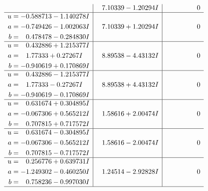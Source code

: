 \documentclass[1p]{elsarticle_modified}
\theoremstyle{definition}
\begin{document}
$$\begin{array}{c|c|c}
 & \phantom{-}7.10339 - 1.20294 I & \phantom{-0.000000 } 0 \\ \hline\begin{aligned}
u &= -0.588713 - 1.140278 I \\
a &= -0.749426 - 1.002063 I \\
b &= \phantom{-}0.478478 - 0.284830 I\end{aligned}
 & \phantom{-}7.10339 + 1.20294 I & \phantom{-0.000000 } 0 \\ \hline\begin{aligned}
u &= \phantom{-}0.432886 + 1.215377 I \\
a &= \phantom{-}1.77333 + 0.27267 I \\
b &= -0.940619 + 0.170869 I\end{aligned}
 & \phantom{-}8.89538 - 4.43132 I & \phantom{-0.000000 } 0 \\ \hline\begin{aligned}
u &= \phantom{-}0.432886 - 1.215377 I \\
a &= \phantom{-}1.77333 - 0.27267 I \\
b &= -0.940619 - 0.170869 I\end{aligned}
 & \phantom{-}8.89538 + 4.43132 I & \phantom{-0.000000 } 0 \\ \hline\begin{aligned}
u &= \phantom{-}0.631674 + 0.304895 I \\
a &= -0.067306 + 0.565212 I \\
b &= \phantom{-}0.707815 + 0.717572 I\end{aligned}
 & \phantom{-}1.58616 + 2.00474 I & \phantom{-0.000000 } 0 \\ \hline\begin{aligned}
u &= \phantom{-}0.631674 - 0.304895 I \\
a &= -0.067306 - 0.565212 I \\
b &= \phantom{-}0.707815 - 0.717572 I\end{aligned}
 & \phantom{-}1.58616 - 2.00474 I & \phantom{-0.000000 } 0 \\ \hline\begin{aligned}
u &= \phantom{-}0.256776 + 0.639731 I \\
a &= -1.249302 - 0.460250 I \\
b &= \phantom{-}0.758236 - 0.997030 I\end{aligned}
 & \phantom{-}1.24514 - 2.92828 I & \phantom{-0.000000 } 0\\
 \hline 
 \end{array}$$\newpage$$\begin{array}{c|c|c}  

\end{array}$$
\end{document}
